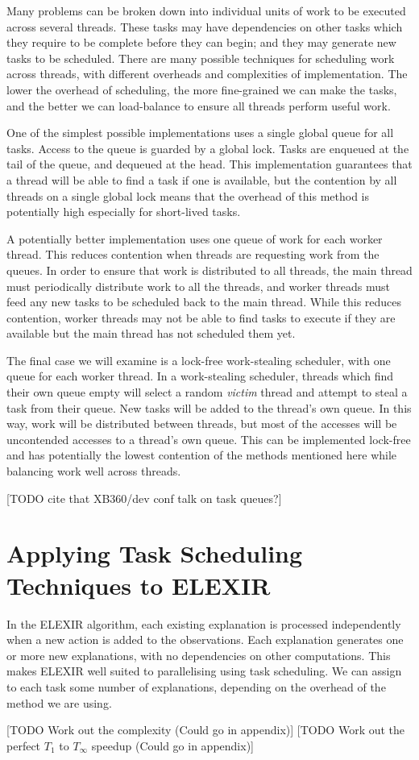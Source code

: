 Many problems can be broken down into individual units of work to be executed across several threads. These tasks may have dependencies on other tasks which they require to be complete before they can begin; and they may generate new tasks to be scheduled. There are many possible techniques for scheduling work across threads, with different overheads and complexities of implementation. The lower the overhead of scheduling, the more fine-grained we can make the tasks, and the better we can load-balance to ensure all threads perform useful work.

One of the simplest possible implementations uses a single global queue for all tasks. Access to the queue is guarded by a global lock. Tasks are enqueued at the tail of the queue, and dequeued at the head. This implementation guarantees that a thread will be able to find a task if one is available, but the contention by all threads on a single global lock means that the overhead of this method is potentially high especially for short-lived tasks.

A potentially better implementation uses one queue of work for each worker thread. This reduces contention when threads are requesting work from the queues. In order to ensure that work is distributed to all threads, the main thread must periodically distribute work to all the threads, and worker threads must feed any new tasks to be scheduled back to the main thread. While this reduces contention, worker threads may not be able to find tasks to execute if they are available but the main thread has not scheduled them yet.

The final case we will examine is a lock-free work-stealing scheduler, with one queue for each worker thread. In a work-stealing scheduler, threads which find their own queue empty will select a random \emph{victim} thread and attempt to steal a task from their queue. New tasks will be added to the thread's own queue. In this way, work will be distributed between threads, but most of the accesses will be uncontended accesses to a thread's own queue. This can be implemented lock-free and has potentially the lowest contention of the methods mentioned here while balancing work well across threads.

[TODO cite that XB360/dev conf talk on task queues?]

\section{Applying Task Scheduling Techniques to ELEXIR}

In the ELEXIR algorithm, each existing explanation is processed independently when a new action is added to the observations. Each explanation generates one or more new explanations, with no dependencies on other computations. This makes ELEXIR well suited to parallelising using task scheduling. We can assign to each task some number of explanations, depending on the overhead of the method we are using.

[TODO Work out the complexity (Could go in appendix)]
[TODO Work out the perfect $T_1$ to $T_\infty$ speedup (Could go in appendix)]
